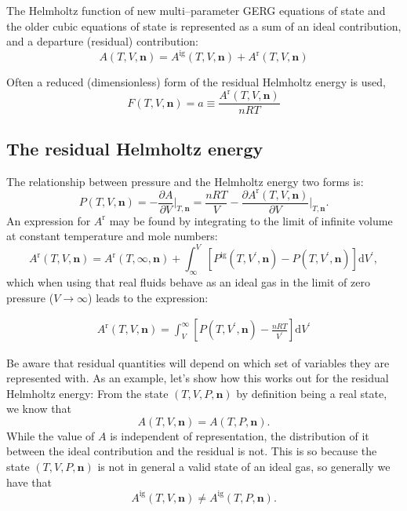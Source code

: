 \documentclass[english]{../thermomemo/thermomemo}
\newcommand{\pone}[3]{\frac{\partial #1}{\partial #2}\bigg|_{#3}}%
\newcommand*{\vektor}[1]{\boldsymbol{#1}}%
\newcommand{\dd}[1]{\mathrm{d}{#1}}
\begin{document}
The Helmholtz function of new multi--parameter GERG equations of state
\cite{kunz07,span96} and the older cubic equations of state is represented as a sum of 
an ideal contribution, and a departure (residual) contribution:
\begin{equation}
\label{eq:helmholtz}
A(T,V,\vektor{n}) = A^{\text{ig}}(T,V,\vektor{n}) + A^{\text{r}}(T,V,\vektor{n})
\end{equation}

Often a reduced (dimensionless) form of the residual Helmholtz energy is used,
\begin{equation}
\label{eq:reduced_helmholtz}
F(T,V,\vektor{n}) = a \equiv  \frac{A^\text{r}(T,V,\vektor{n})}{nRT}
\end{equation}

\subsection{The residual Helmholtz energy}

The relationship between pressure and the Helmholtz energy two forms is:
\begin{equation}
  P(T,V,\vektor{n}) = -\pone{A}{V}{T,\vektor{n}} 
  = \frac{nRT}{V} - \pone{A^{\text{r}}(T,V,\vektor{n})}{V}{T,\vektor{n}}.
  \label{}
\end{equation}
An expression for $A^\text{r}$ may be found by integrating to the limit of infinite volume at constant temperature and mole numbers:
\begin{equation}
  A^\text{r}(T,V,\vektor{n}) 
  = A^\text{r}(T,\infty,\vektor{n}) + \int_\infty^V \left[ P^\text{ig}(T,V^\prime,\vektor{n}) - P(T,V^\prime,\vektor{n}) \right]\dd{V^\prime},
  \label{}
\end{equation}
which when using that real fluids behave as an ideal gas in the limit of zero pressure ($V \to \infty$) leads to the expression:
\begin{framed}
\begin{align}
  A^\text{r}(T,V,\vektor{n}) 
  = \int^\infty_V \left[ P(T,V^\prime,\vektor{n}) - \frac{nRT}{V^\prime} \right]\dd{V^\prime}
  \label{eq:helmholtz_int}
\end{align}
\end{framed}

Be aware that residual quantities will depend on which set of variables they are represented with. As an example, let's show 
how this works out for the residual Helmholtz energy:
From the state $(T,V,P,\vektor{n})$ by definition being a real state, we know that 
\begin{equation}
  A(T,V,\vektor{n}) = A(T,P,\vektor{n}).
  \label{eq:Aequal}
\end{equation}
While the value of $A$ is independent of representation, the distribution of it between the ideal 
contribution and the residual is not. This is so because  
the state $(T,V,P,\vektor{n})$ is not in 
general a valid state of an ideal gas, so 
generally we have that
\begin{equation}
  A^\text{ig}(T,V,\vektor{n}) \neq A^\text{ig}(T,P,\vektor{n}).
  \label{}
\end{equation}
\end{document}
